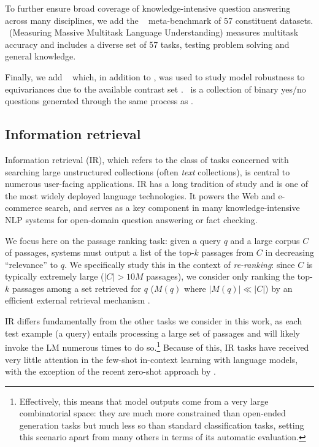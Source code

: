 To further ensure broad coverage of knowledge-intensive question answering across many disciplines, we add the \mmlu~\citep{hendrycks2021measuring} meta-benchmark of 57 constituent datasets. 
\mmlu~(Measuring Massive Multitask Language Understanding) measures multitask accuracy and includes a diverse set of 57 tasks, testing problem solving and general knowledge.

Finally, we add \boolq~\citep{clark2019boolq} which, in addition to \quac, was used to study model robustness to equivariances due to the available contrast set \citep{gardner2020contrast}.
\boolq~is a collection of binary yes/no questions generated through the same process as \naturalquestions.

\hypertarget{informationRetrieval}{\subsection{Information retrieval}}
\label{sec:informationRetrieval}

Information retrieval (IR), which refers to the class of tasks concerned with searching large unstructured collections (often \textit{text} collections), is central to numerous user-facing applications.
IR has a long tradition of study \citep{salton1965smart, salton1971smart,  jones1972statistical, salton1983introduction, manning2008introduction, lin2021pretrained} and is one of the most widely deployed language technologies.
It powers the Web and e-commerce search, and serves as a key component in many knowledge-intensive NLP systems for open-domain question answering or fact checking.

We focus here on the passage ranking task: given a query $q$ and a large corpus $C$ of passages, systems must output a list of the top-$k$ passages from $C$ in decreasing ``relevance'' to $q$. We specifically study this in the context of \textit{re-ranking}: since $C$ is typically extremely large (\eg $|C| > 10M$ passages), we consider only ranking the top-$k$ passages among a set retrieved for $q$ (\ie $M(q)$ where $|M(q)| \ll |C|$) by an efficient external retrieval mechanism \citep[\eg BM25;][]{robertson2009probabilistic}.

IR differs fundamentally from the other tasks we consider in this work, as each test example (\ie a query) entails processing a large set of passages and will likely invoke the LM numerous times to do so.\footnote{Effectively, this means that model outputs come from a very large combinatorial space: they are much more constrained than open-ended generation tasks but much less so than standard classification tasks, setting this scenario apart from many others in terms of its automatic evaluation.} Because of this, IR tasks have received very little attention in the few-shot in-context learning with language models, with the exception of the recent zero-shot approach by \citet{sachan2022improving}.

